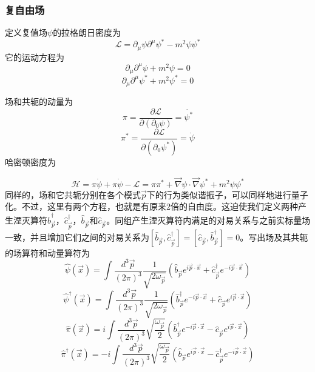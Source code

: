 \documentclass[a4paper,11pt]{ctexart}
\newcommand{\beq}{\begin{equation}}
\newcommand{\eeq}{\end{equation}}
\newcommand{\lag}{\mathcal{L}}
\newcommand{\ham}{\mathcal{H}}
\begin{document}
\subsubsection{复自由场}
定义复值场$\psi$的拉格朗日密度为
\beq
\lag = \partial_\mu \psi \partial^\mu \psi^* - m^2 \psi \psi^*
\eeq
它的运动方程为
\beq
\partial_\mu \partial^\mu \psi + m^2 \psi = 0
\eeq
\beq
\partial_\mu \partial^\mu \psi^* + m^2 \psi^* = 0
\eeq
\par
场和共轭的动量为
\beq
\pi = \frac{\partial \lag}{\partial (\partial_0 \psi)} = \dot{\psi^*}
\eeq
\beq
\pi^* = \frac{\partial \lag}{\partial (\partial_0 \psi^*)} = \dot{\psi}
\eeq
哈密顿密度为
\par
\beq
\ham = \pi \dot{\psi} + \pi \dot{\psi} - \lag = \pi \pi^* + \vec{\nabla}\psi \cdot \vec{\nabla}\psi^* + m^2 \psi \psi^*
\eeq
同样的，场和它共轭分别在各个模式$\vec{p}$下的行为类似谐振子，可以同样地进行量子化。不过，这里有两个方程，也就是有原来2倍的自由度。这迫使我们定义两种产生湮灭算符$\hat{b}_{\vec{p}}^\dagger$，$\hat{c}_{\vec{p}}^\dagger$，$\hat{b}_{\vec{p}}$和$\hat{c}_{\vec{p}}$。同组产生湮灭算符内满足的对易关系与之前实标量场一致，并且增加它们之间的对易关系为$[\hat{b}_{\vec{p}},\hat{c}_{\vec{p}}^\dagger] = [\hat{c}_{\vec{p}},\hat{b}_{\vec{p}}^\dagger] = 0$。写出场及其共轭的场算符和动量算符为
\beq
\hat{\psi}(\vec{x}) = \int \frac{d^3 \vec{p}}{(2\pi)^3} \frac{1}{\sqrt{2 \omega_{\vec{p}}}} (\hat{b}_{\vec{p}} e^{i\vec{p} \cdot \vec{x}} + \hat{c}_{\vec{p}}^\dagger e^{-i\vec{p}\cdot \vec{x}})
\eeq
\beq
\hat{\psi}^\dagger (\vec{x}) = \int \frac{d^3 \vec{p}}{(2\pi)^3} \frac{1}{\sqrt{2 \omega_{\vec{p}}}} (\hat{b}_{\vec{p}}^\dagger e^{-i\vec{p} \cdot \vec{x}} + \hat{c}_{\vec{p}} e^{i\vec{p}\cdot \vec{x}})
\eeq
\beq
\hat{\pi}(\vec{x}) = i \int \frac{d^3\vec{p}}{(2\pi)^3} \sqrt{\frac{\omega_{\vec{p}}}{2}} (\hat{b}_{\vec{p}}^\dagger e^{-i\vec{p} \cdot \vec{x}} - \hat{c}_{\vec{p}} e^{i\vec{p}\cdot \vec{x}})
\eeq
\beq
\hat{\pi}^\dagger(\vec{x}) = -i \int \frac{d^3\vec{p}}{(2\pi)^3} \sqrt{\frac{\omega_{\vec{p}}}{2}} (\hat{b}_{\vec{p}} e^{i\vec{p} \cdot \vec{x}}  -\hat{c}_{\vec{p}}^\dagger e^{-i\vec{p}\cdot \vec{x}})
\eeq
\end{document}
